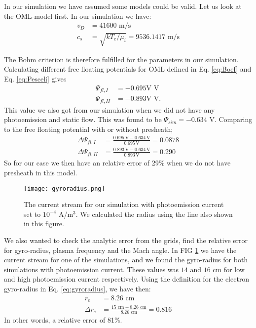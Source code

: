 \documentclass[aip, 
rsi, 
amsmath,
amssymb,
longbibliography,
preprint]{revtex4-1}
\begin{document}
In our simulation we have assumed some models could be valid. Let us look at the OML-model first. In our simulation we have:
\begin{align*}
v_D &= 41600 \, \, \text{m/s}\\
c_s &= \sqrt{k T_e / \mu_i} = 9536.1417 \, \, \text{m/s}
\end{align*}

The Bohm criterion is therefore fulfilled for the parameters in our simulation. Calculating different free floating potentials for OML defined in Eq. \ref{eq:Boef} and Eq. \ref{eq:Pesceli} gives
\begin{align*}
\Psi_{fl,I} &= -0.695\text{V} \, \, \text{V}\\
\Psi_{fl,II}&= -0.893 \text{V}\, \, \text{V}.
\end{align*}
This value we also got from our simulation when we did not have any photoemission and static flow. This was found to be $\Psi_{sim} = -0.634$ V. Comparing to the free floating potential with or without presheath;
\begin{align*}
\Delta \Psi_{fl,I} &= \frac{0.695 \, \text{V} -0.634 \, \text{V}}{0.695 \, \text{V}} = 0.0878\\
\Delta \Psi_{fl,II} &= \frac{0.893 \, \text{V} -0.634 \, \text{V}}{0.893 \, \text{V}} = 0.290
\end{align*}
So for our case we then have an relative error of 29\% when we do not have presheath in this model.\\

\begin{figure}
\texttt{[image: gyroradius.png]}
\caption{The current stream for our simulation with photoemission current set to $10^{-4}$ A/m$^3$. We calculated the radius using the line also shown in this figure.\label{fig:gyroradius}}
\end{figure}

We also wanted to check the analytic error from the grids, find the relative error for gyro-radius, plasma frequency and the Mach angle. In FIG \ref{fig:gyroradius} we have the current stream for one of the simulations, and we found the gyro-radius for both simulations with photoemission current. These values was $14$ and $16$ cm for low and high photoemission current respectively. Using the definition for the electron gyro-radius in Eq. \ref{eq:gyroradius}, we have then:
\begin{align*}
r_e &= 8.26 \, \, \text{cm}\\
\Delta r_e &= \frac{15 \, \, \text{cm}- 8.26 \, \, \text{cm}}{8.26 \, \, \text{cm}} = 0.816
\end{align*}
In other words, a relative error of 81\%.\\
\end{document}
